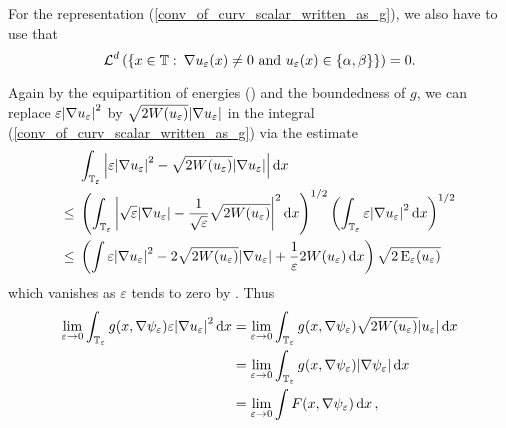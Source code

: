 For the representation (\ref{conv_of_curv_scalar_written_as_g}), we also have to use that 
\begin{equation*}
	\operatorname{\mathcal{L}}^{ d } \left(
		\left\{
			x \in \operatorname{\mathbb{T}}
			\, \colon \,
			\nabla u_{ \varepsilon } ( x ) \neq 0 \text{ and } u_{ \varepsilon } ( x ) \in \{ \alpha , \beta \}
		\right\}
	\right)
	=
	0.
\end{equation*}

Again by the equipartition of energies () and the boundedness of $ g $, we can replace $ \varepsilon \abs{ \nabla u_{ \varepsilon } }^{ 2 } $ by $ \sqrt{ 2 W ( u_{ \varepsilon } ) } \abs{ \nabla u_{ \varepsilon } } $ in the integral (\ref{conv_of_curv_scalar_written_as_g}) via the estimate
\begin{align*}
	& \int_{ \operatorname{\mathbb{T}}_{ \varepsilon } }
		\abs{ 
			\varepsilon \abs{ \nabla u_{ \varepsilon } }^{ 2 }
			-
			\sqrt{ 2 W ( u_{ \varepsilon } ) } \abs{ \nabla u_{\varepsilon } }
		}
	\dd{ x }
	\\
	\leq {} &
	\left(
		\int_{ \operatorname{\mathbb{T}}_{ \varepsilon } }
			\abs{ 
				\sqrt{ \varepsilon } \abs{ \nabla u_{ \varepsilon } } 
				- 
				\frac{ 1 }{ \sqrt{ \varepsilon } } \sqrt{ 2 W ( u_{ \varepsilon } ) } 
			}^{ 2 }
		\dd{ x }
	\right)^{ 1/2 }
	\left(
		\int_{ \operatorname{\mathbb{T}}_{ \varepsilon } }
			\varepsilon \abs{ \nabla u_{ \varepsilon } }^{ 2 }
		\dd{ x }
	\right)^{ 1/ 2 }
	\\
	\leq {} &
	\left(
		\int
			\varepsilon \abs{ \nabla u_{ \varepsilon } }^{ 2 }
			-
			2 \sqrt{ 2 W ( u_{ \varepsilon } ) } \abs{ \nabla u_{ \varepsilon } }
			+
			\frac{ 1 }{ \varepsilon }
			2 W ( u_{ \varepsilon } )
		\dd{ x }
	\right)
	\sqrt{ 2 \operatorname{E}_{ \varepsilon } ( u_{ \varepsilon } ) }
\end{align*}
which vanishes as $ \varepsilon $ tends to zero by .
Thus
\begin{align*}
	\lim_{ \varepsilon \to 0 }
	\int_{ \operatorname{\mathbb{T}}_{ \varepsilon } }
		g ( x , \nabla \psi_{ \varepsilon  } )
		\varepsilon \abs{ \nabla u_{ \varepsilon } }^{ 2 }
	\dd{ x }
	& =
	\lim_{ \varepsilon \to 0 }
		\int_{ \operatorname{\mathbb{T}}_{ \varepsilon } }
			g ( x , \nabla \psi_{ \varepsilon  } )
		\sqrt{ 2 W ( u_{ \varepsilon } ) } 
		\abs{ u_{ \varepsilon } }
	\dd{ x }
	 \\
	 & =
	 \lim_{ \varepsilon \to 0 }
	 	\int_{ \operatorname{\mathbb{T}}_{ \varepsilon } }
	 		g ( x , \nabla \psi_{ \varepsilon  } ) \abs{ \nabla \psi_{ \varepsilon  } }
	 	\dd{ x }
	 \\
	 & = 
	 \lim_{ \varepsilon \to 0 }
	 	\int
	 		F ( x, \nabla \psi_{ \varepsilon } )
	 	\dd{ x },
\end{align*}
